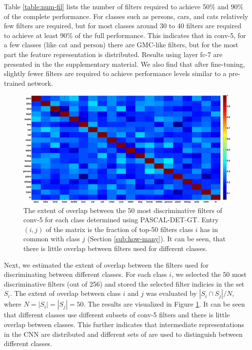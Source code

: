 Table \ref{table:num-fil} lists the number of filters required to achieve 50\% and 90\% of the complete performance. For classes such as persons, cars, and cats relatively few filters are required, but for most classes around 30 to 40 filters are required to achieve at least 90\% of the full performance. This indicates that in conv-5, for a few classes (like cat and person) there are GMC-like filters, but for the most part the feature representation is distributed.
Results using layer fc-7 are presented in the the supplementary material.
We also find that after fine-tuning, slightly fewer filters are required to achieve performance levels similar to a pre-trained network. 

\begin{figure}[t!]
\centering
\includegraphics[width=1.0\linewidth]{images/FTNet_overlap.pdf}
\caption{The extent of overlap between the 50 most discriminative filters of conv-5 for each class determined using PASCAL-DET-GT.
Entry $(i, j)$ of the matrix is the fraction of top-50 filters class $i$ has in common with class $j$ (Section \ref{sub:how-many}). It can be seen, that there is little overlap between filters used for different classes.}
\label{fig:overlap}
\end{figure}

Next, we estimated the extent of overlap between the filters used for discriminating between different classes.
For each class $i$, we selected the 50 most discriminative filters (out of 256) and stored the selected filter indicies in the set $S_i$.
The extent of overlap between class $i$ and $j$ was evaluated by $|S_i \cap S_j| / N$,
where $N = |S_i| = |S_j| = 50$. The results are visualized in Figure \ref{fig:overlap}. It can be seen that different classes use different subsets of conv-5 filters and there is little overlap between classes. This further indicates that intermediate representations in the CNN are distributed and different sets of are used to distinguish between different classes. 

